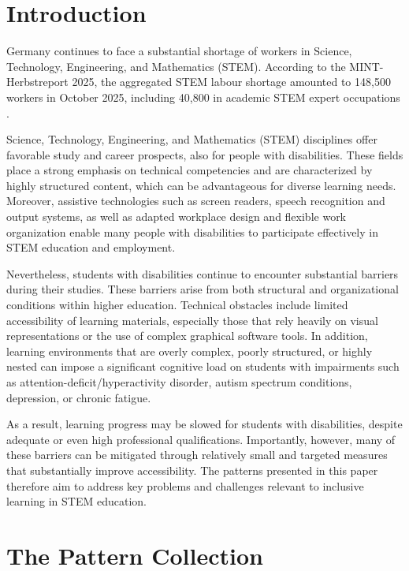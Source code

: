 \section{Introduction}

Germany continues to face a substantial shortage of workers in Science, Technology, Engineering, and Mathematics (STEM). According to the MINT-Herbstreport 2025, the aggregated STEM labour shortage amounted to 148,500 workers in October 2025, including 40,800 in academic STEM expert occupations \cite{Anger2025MINT}.

Science, Technology, Engineering, and Mathematics (STEM) disciplines offer favorable study and career prospects, also for people with disabilities. These fields place a strong emphasis on technical competencies and are characterized by highly structured content, which can be advantageous for diverse learning needs. Moreover, assistive technologies such as screen readers, speech recognition and output systems, as well as adapted workplace design and flexible work organization enable many people with disabilities to participate effectively in STEM education and employment.

Nevertheless, students with disabilities continue to encounter substantial barriers during their studies. These barriers arise from both structural and organizational conditions within higher education. Technical obstacles include limited accessibility of learning materials, especially those that rely heavily on visual representations or the use of complex graphical software tools. In addition, learning environments that are overly complex, poorly structured, or highly nested can impose a significant cognitive load on students with impairments such as attention-deficit/hyperactivity disorder, autism spectrum conditions, depression, or chronic fatigue.

As a result, learning progress may be slowed for students with disabilities, despite adequate or even high professional qualifications. Importantly, however, many of these barriers can be mitigated through relatively small and targeted measures that substantially improve accessibility. The patterns presented in this paper therefore aim to address key problems and challenges relevant to inclusive learning in STEM education.

\section{The Pattern Collection}

